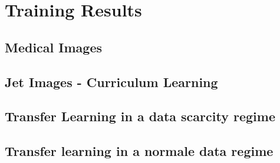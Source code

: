 \chapter{Training Results}

\section{Medical Images}

\section{Jet Images - Curriculum Learning}

\section{Transfer Learning in a data scarcity regime}

\section{Transfer learning in a normale data regime}